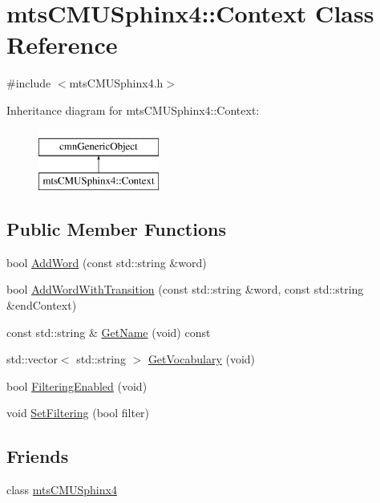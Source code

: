 \hypertarget{classmts_c_m_u_sphinx4_1_1_context}{\section{mts\-C\-M\-U\-Sphinx4\-:\-:Context Class Reference}
\label{classmts_c_m_u_sphinx4_1_1_context}
}


{\ttfamily \#include $<$mts\-C\-M\-U\-Sphinx4.\-h$>$}

Inheritance diagram for mts\-C\-M\-U\-Sphinx4\-:\-:Context\-:\begin{figure}[H]
\begin{center}
\leavevmode
\includegraphics[height=2.000000cm]{d2/dde/classmts_c_m_u_sphinx4_1_1_context}
\end{center}
\end{figure}
\subsection*{Public Member Functions}
\begin{DoxyCompactItemize}
\item 
bool \hyperlink{classmts_c_m_u_sphinx4_1_1_context_aec1afbfd439d7578ff6ead7153aaf3c1}{Add\-Word} (const std\-::string \&word)
\item 
bool \hyperlink{classmts_c_m_u_sphinx4_1_1_context_aa8289ca9ebc0f2b4f307fd2ba0d46af4}{Add\-Word\-With\-Transition} (const std\-::string \&word, const std\-::string \&end\-Context)
\item 
const std\-::string \& \hyperlink{classmts_c_m_u_sphinx4_1_1_context_aa1620177d66a6075614b95df09065faa}{Get\-Name} (void) const 
\item 
std\-::vector$<$ std\-::string $>$ \hyperlink{classmts_c_m_u_sphinx4_1_1_context_a0e2994ee8da0a2573ec44c84da31fa29}{Get\-Vocabulary} (void)
\item 
bool \hyperlink{classmts_c_m_u_sphinx4_1_1_context_aa9e05b62607f0cd23d698fc2b8bd09c6}{Filtering\-Enabled} (void)
\item 
void \hyperlink{classmts_c_m_u_sphinx4_1_1_context_aa32231ba771069dfb3a8eb4147d3f039}{Set\-Filtering} (bool filter)
\end{DoxyCompactItemize}
\subsection*{Friends}
\begin{DoxyCompactItemize}
\item 
class \hyperlink{classmts_c_m_u_sphinx4_1_1_context_a9fe1241bdee240deba664bfbaadf5301}{mts\-C\-M\-U\-Sphinx4}
\end{DoxyCompactItemize}


